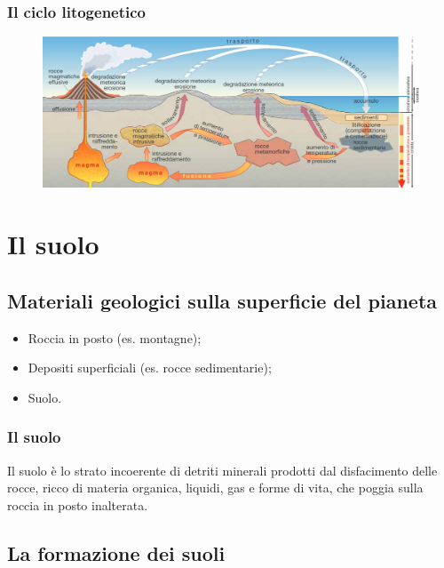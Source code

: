 \documentclass{article}
\begin{document}
\subsubsection{Il ciclo litogenetico}
\phantom{}

\begin{figure}[ht!]
    \begin{center}
        \includegraphics[width=\textwidth]{media/geo_fisica/ciclo_litogenetico.png}
    \end{center}
\end{figure}

\newpage
\section{Il suolo}
\subsection{Materiali geologici sulla superficie del pianeta}
\begin{itemize}
    \item Roccia in posto (es. montagne);
    \item Depositi superficiali (es. rocce sedimentarie);
    \item Suolo.
\end{itemize}

\subsubsection{Il suolo}
Il suolo è lo strato incoerente di detriti minerali prodotti dal disfacimento delle rocce,
ricco di materia organica, liquidi, gas e forme di vita, che poggia sulla roccia in posto
inalterata.

\subsection{La formazione dei suoli}
\end{document}
